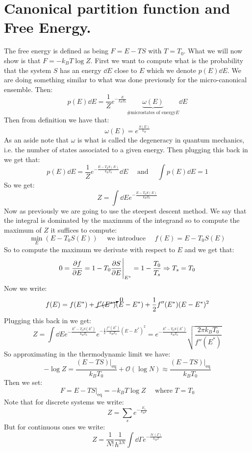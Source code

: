 \documentclass[10pt,a4paper]{book}
\begin{document}
\section{Canonical partition function and Free Energy.}
The free energy is defined as being $F = E - T S$ with $T = T_0$. What we will now show is that $F = -k_B T \log Z$. First we want to compute what is the probability that the system $S$ has an energy $\dd E$ close to $E$ which we denote $p(E) \dd E$. We are doing something similar to what was done previously for the micro-canonical ensemble. Then:
\[
p(E) \dd E = \frac{1}{Z}e^{-\frac{E}{k_B T_0}} \underbrace{\omega(E)}_{\text{\# microstates of energy} E} \dd E
\]
Then from definition we have that:
\[
\omega(E) = e^\frac{S(E)}{k_B}
\]
As an aside note that $\omega$ is what is called the degeneracy in quantum mechanics, i.e. the number of states associated to a given energy. Then plugging this back in we get that:
\[
p(E) \dd E = \frac{1}{Z} e^{-\frac{E - T_0 S(E)}{k_B T_0}} \dd E \quad \text{ and } \quad \int p(E)\dd E = 1 
\]
So we get:
\[
Z = \int \dd E e^{-\frac{E - T_0 S(E)}{k_B T_0}}
\]
Now as previously we are going to use the steepest descent method. We say that the integral is dominated by the maximum of the integrand so to compute the maximum of $Z$ it suffices to compute:
\[
\min_E (E - T_0 S(E)) \quad \text{ we introduce } \quad f(E) = E - T_0 S(E)
\]
So to compute the maximum we derivate with respect to $E$ and we get that:
\[
0 = \pdv{f}{E} = 1 - T_0 \pdv{S}{E}\Bigg|_{E^*} = 1 - \frac{T_0}{T_s} \Rightarrow T_s = T_0
\]
Now we write:
\[
f(E) = f(E^*) + \cancelto{0}{f'(E^*)} (E - E^*) + \frac{1}{2} f''(E^*) (E - E^*)^2
\]
Plugging this back in we get:
\[
Z = \int \dd E e^{-\frac{E^* - T_0 S(E^*)}{k_B T_0}} e^{-\frac{1}{2} \frac{f''(E^*)}{k_B T_0} (E - E^*)^2} = e^{-\frac{E^* - T_0 S(E^*)}{k_B T_0}} \sqrt{\frac{2\pi k_B T_0}{f''(E^*)}}
\]
So approximating in the thermodynamic limit we have:
\[
-\log Z = \frac{(E - TS)\Big|_{\text{eq}}}{k_B T_0} + \mathcal{O}(\log N) \approx \frac{(E - TS)\Big|_{\text{eq}}}{k_B T_0}
\]
Then we set:
\[
F = E - TS \Big|_\text{eq} = - k_B T \log Z \quad \text{ where } T = T_0
\]
Note that for discrete systems we write:
\[
Z = \sum_s e^{-\frac{E_s}{k_B T}}
\]
But for continuous ones we write:
\[
Z = \frac{1}{N!} \frac{1}{h^{3N}} \int \dd \Gamma e^{-\frac{\mathcal{H}(\Gamma)}{k_B T}}
\]
\end{document}
